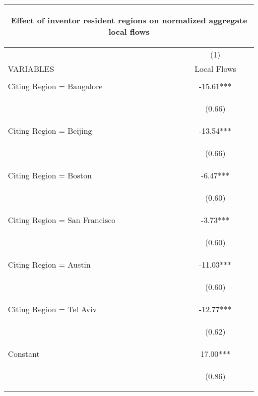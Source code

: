 \begin{center}
\begin{tabular}{lc}
\multicolumn{2}{c}{\begin{large}Effect of inventor resident regions on normalized aggregate local flows \label{slocal}\end{large}} \\ \hline
 & (1) \\
VARIABLES & Local Flows \\ \hline
\vspace{4pt} & \begin{footnotesize}\end{footnotesize} \\
Citing Region = Bangalore & -15.61*** \\
\vspace{4pt} & \begin{footnotesize}(0.66)\end{footnotesize} \\
Citing Region = Beijing & -13.54*** \\
\vspace{4pt} & \begin{footnotesize}(0.66)\end{footnotesize} \\
Citing Region = Boston & -6.47*** \\
\vspace{4pt} & \begin{footnotesize}(0.60)\end{footnotesize} \\
Citing Region = San Francisco & -3.73*** \\
\vspace{4pt} & \begin{footnotesize}(0.60)\end{footnotesize} \\
Citing Region = Austin & -11.03*** \\
\vspace{4pt} & \begin{footnotesize}(0.60)\end{footnotesize} \\
Citing Region = Tel Aviv & -12.77*** \\
\vspace{4pt} & \begin{footnotesize}(0.62)\end{footnotesize} \\
Constant & 17.00*** \\
 & \begin{footnotesize}(0.86)\end{footnotesize} \\

\end{tabular}
\end{center}
